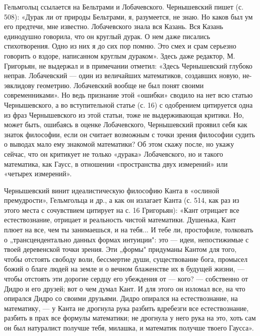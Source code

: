 Гельмгольц ссылается на Бельтрами и Лобачевского. Чернышевский пишет (с. 508):
«Дурак ли от природы Бельтрами, я, разумеется, не знаю. Но каков был ум его
предтечи, мне известно. Лобачевского знала вся Казань. Вся Казань единодушно
говорила, что он круглый дурак. О нем даже писались стихотворения. Одно из них
я до сих пор помню. Это смех и срам серьезно говорить о вздоре, написанном
круглым дураком». Здесь даже редактор, М. Григорьян, не выдержал и в примечании
отметил: «Здесь Чернышевский глубоко неправ. Лобачевский --- один из величайших
математиков, создавших новую, не-эвклидову геометрию. Лобачевский вообще не был
понят своими современниками». Но ведь признание этой «ошибки» сводило на нет
всю статью Чернышевского, а во вступительной статье (с. 16) с одобрением
цитируется одна из фраз Чернышевского из этой статьи, тоже не выдерживающая
критики. Но, может быть, ошибаясь в оценке Лобачевского, Чернышевский проявил
себя как знаток философии, если он считает возможным с точки зрения философии
судить о выводах
мало ему знакомой математики? Об этом скажу после, но укажу сейчас, что он
критикует не только «дурака» Лобачевского, но и такого математика, как Гаусс, в
отношении «пространства двух измерений» или «четырех измерений».

Чернышевский винит идеалистическую философию Канта в «ослиной премудрости»,
Гельмгольца и др., а как он излагает Канта (с. 514, как раз из этого места с
сочувствием цитирует на с. 16 Григорьян): «Кант отрицает все естествознание,
отрицает и реальность чистой математики. Душенька, Кант плюет на все, чем ты
занимаешься, и на тебя... И тебе ли, простофиле, толковать о „трансцендентально
данных формах интуиции": это --- идеи, непостижимые с твоей деревенской точки
зрения. Эти „формы" придуманы Кантом для того, чтобы отстоять свободу воли,
бессмертие души, существование бога, промысел божий о благе людей на земле и о
вечном блаженстве их в будущей жизни, --- чтобы отстоять эти дорогие сердцу его
убеждения от --- кого? --- собственно от Дидро и его друзей; вот о чем думал Кант.
И для этого он изломал все, на что опирался Дидро со своими друзьями. Дидро
опирался на естествознание, на математику, --- у Канта не дрогнула рука разбить
вдребезги все естествознание, разбить в прах все формулы математики; не
дрогнула у него рука на это, хоть сам он был натуралист получше тебя, милашка,
и математик получше твоего Гаусса».

